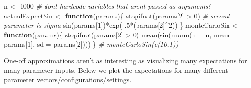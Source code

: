 \documentclass[
  12pt,
  krantz2]{krantz}
\makeatletter
\newenvironment{Shaded}{\begin{snugshade}}{\end{snugshade}}
\newcommand{\AttributeTok}[1]{\textcolor[rgb]{0.61,0.61,0.61}{#1}}
\newcommand{\CommentTok}[1]{\textcolor[rgb]{0.37,0.37,0.37}{\textit{#1}}}
\newcommand{\ControlFlowTok}[1]{\textcolor[rgb]{0.27,0.27,0.27}{\textbf{#1}}}
\newcommand{\DecValTok}[1]{\textcolor[rgb]{0.06,0.06,0.06}{#1}}
\newcommand{\FunctionTok}[1]{\textcolor[rgb]{0,0,0}{#1}}
\newcommand{\NormalTok}[1]{#1}
\newcommand{\OtherTok}[1]{\textcolor[rgb]{0.37,0.37,0.37}{#1}}
\newcommand{\SpecialCharTok}[1]{\textcolor[rgb]{0,0,0}{#1}}
\newenvironment{kframe}{%
\medskip{}
\setlength{\fboxsep}{.8em}
 \def\at@end@of@kframe{}%
 \ifinner\ifhmode%
  \def\at@end@of@kframe{\end{minipage}}%
  \begin{minipage}{\columnwidth}%
 \fi\fi%
 \def\FrameCommand##1{\hskip\@totalleftmargin \hskip-\fboxsep
 \colorbox{shadecolor}{##1}\hskip-\fboxsep
     \hskip-\linewidth \hskip-\@totalleftmargin \hskip\columnwidth}%
 \MakeFramed {\advance\hsize-\width
   \@totalleftmargin\z@ \linewidth\hsize
   \@setminipage}}%
 {\par\unskip\endMakeFramed%
 \at@end@of@kframe}
\renewenvironment{Shaded}{\begin{kframe}}{\end{kframe}}
\makeatother
\begin{document}
\begin{Shaded}
\begin{Highlighting}[]
\NormalTok{n }\OtherTok{\textless{}{-}} \DecValTok{1000} \CommentTok{\# don\textquotesingle{}t hardcode variables that aren\textquotesingle{}t passed as arguments!}
\NormalTok{actualExpectSin }\OtherTok{\textless{}{-}} \ControlFlowTok{function}\NormalTok{(params)\{}
  \FunctionTok{stopifnot}\NormalTok{(params[}\DecValTok{2}\NormalTok{] }\SpecialCharTok{\textgreater{}} \DecValTok{0}\NormalTok{) }\CommentTok{\# second parameter is sigma}
  \FunctionTok{sin}\NormalTok{(params[}\DecValTok{1}\NormalTok{])}\SpecialCharTok{*}\FunctionTok{exp}\NormalTok{(}\SpecialCharTok{{-}}\NormalTok{.}\DecValTok{5}\SpecialCharTok{*}\NormalTok{(params[}\DecValTok{2}\NormalTok{]}\SpecialCharTok{\^{}}\DecValTok{2}\NormalTok{))}
\NormalTok{\}}
\NormalTok{monteCarloSin }\OtherTok{\textless{}{-}} \ControlFlowTok{function}\NormalTok{(params)\{}
  \FunctionTok{stopifnot}\NormalTok{(params[}\DecValTok{2}\NormalTok{] }\SpecialCharTok{\textgreater{}} \DecValTok{0}\NormalTok{) }
  \FunctionTok{mean}\NormalTok{(}\FunctionTok{sin}\NormalTok{(}\FunctionTok{rnorm}\NormalTok{(}\AttributeTok{n =}\NormalTok{ n, }\AttributeTok{mean =}\NormalTok{ params[}\DecValTok{1}\NormalTok{], }\AttributeTok{sd =}\NormalTok{ params[}\DecValTok{2}\NormalTok{])))}
\NormalTok{\}}
\CommentTok{\# monteCarloSin(c(10,1))}
\end{Highlighting}
\end{Shaded}

One-off approximations aren't as interesting as visualizing many expectations for many parameter inputs. Below we plot the expectations for many different parameter vectors/configurations/settings.
\end{document}
